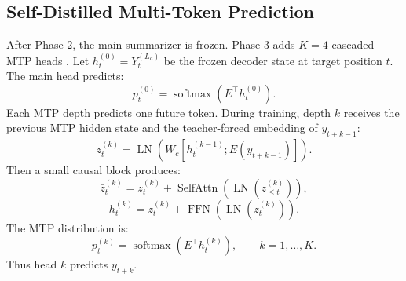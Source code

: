 \documentclass[11pt]{article}
\begin{document}
\subsection{Self-Distilled Multi-Token Prediction}

After Phase 2, the main summarizer is frozen.
Phase 3 adds $K=4$ cascaded MTP heads \citep{gloeckle2024mtp,zhao2026mtpdistill,deepseekai2024deepseekv3}.
Let $h_t^{(0)}=Y^{(L_d)}_t$ be the frozen decoder state at target position $t$.
The main head predicts:
\begin{equation}
p_t^{(0)}=\operatorname{softmax}(E^\top h_t^{(0)}).
\end{equation}
Each MTP depth predicts one future token.
During training, depth $k$ receives the previous MTP hidden state and the teacher-forced embedding of $y_{t+k-1}$:
\begin{equation}
z_t^{(k)}
=\operatorname{LN}\left(W_c[h_t^{(k-1)};E(y_{t+k-1})]\right).
\end{equation}
Then a small causal block produces:
\begin{equation}
\bar{z}_t^{(k)}
=z_t^{(k)}+\operatorname{SelfAttn}(\operatorname{LN}(z_{\leq t}^{(k)})),
\end{equation}
\begin{equation}
h_t^{(k)}
=\bar{z}_t^{(k)}
+\operatorname{FFN}(\operatorname{LN}(\bar{z}_t^{(k)})).
\end{equation}
The MTP distribution is:
\begin{equation}
p_t^{(k)}=\operatorname{softmax}(E^\top h_t^{(k)}),
\qquad k=1,\ldots,K.
\end{equation}
Thus head $k$ predicts $y_{t+k}$.
\end{document}
